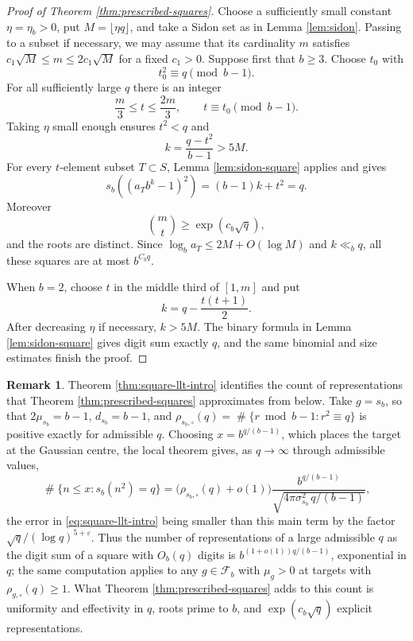 \documentclass[11pt,reqno]{amsart}
\theoremstyle{plain}
\theoremstyle{definition}
\newtheorem{remark}[theorem]{Remark}
\newcommand{\eps}{\varepsilon}
\newcommand{\1}{\mathbf 1}
\DeclareMathOperator{\Card}{\#}
\begin{document}
\begin{proof}[Proof of Theorem \ref{thm:prescribed-squares}]
Choose a sufficiently small constant $\eta=\eta_b>0$, put $M=\lfloor\eta q\rfloor$, and take a Sidon set as in Lemma \ref{lem:sidon}.  Passing to a subset if necessary, we may assume that its cardinality $m$ satisfies $c_1\sqrt M\le m\le2c_1\sqrt M$ for a fixed $c_1>0$.  Suppose first that $b\ge3$.  Choose $t_0$ with
\[
 t_0^2\equiv q\pmod{b-1}.
\]
For all sufficiently large $q$ there is an integer
\[
 \frac m3\le t\le\frac{2m}3,\qquad t\equiv t_0\pmod{b-1}.
\]
Taking $\eta$ small enough ensures $t^2<q$ and
\[
 k=\frac{q-t^2}{b-1}>5M.
\]
For every $t$-element subset $T\subset S$, Lemma \ref{lem:sidon-square} applies and gives
\[
 s_b((a_Tb^k-1)^2)=(b-1)k+t^2=q.
\]
Moreover
\[
 \binom mt\ge \exp(c_b\sqrt q),
\]
and the roots are distinct.  Since $\log_ba_T\le2M+O(\log M)$ and $k\ll_bq$, all these squares are at most $b^{C_bq}$.

When $b=2$, choose $t$ in the middle third of $[1,m]$ and put
\[
 k=q-\frac{t(t+1)}2.
\]
After decreasing $\eta$ if necessary, $k>5M$.  The binary formula in Lemma \ref{lem:sidon-square} gives digit sum exactly $q$, and the same binomial and size estimates finish the proof.
\end{proof}

\begin{remark}\label{rem:llt-count}
Theorem \ref{thm:square-llt-intro} identifies the count of representations that Theorem \ref{thm:prescribed-squares} approximates from below.  Take $g=s_b$, so that $2\mu_{s_b}=b-1$, $d_{s_b}=b-1$, and $\rho_{s_b,\square}(q)=\Card\{r\bmod{b-1}:r^2\equiv q\}$ is positive exactly for admissible $q$.  Choosing $x=b^{q/(b-1)}$, which places the target at the Gaussian centre, the local theorem gives, as $q\to\infty$ through admissible values,
\[
 \Card\{n\le x:s_b(n^2)=q\}
 =\bigl(\rho_{s_b,\square}(q)+o(1)\bigr)
 \frac{b^{q/(b-1)}}{\sqrt{4\pi\sigma_{s_b}^2\,q/(b-1)}},
\]
the error in \eqref{eq:square-llt-intro} being smaller than this main term by the factor $\sqrt q/(\log q)^{5+\eps}$.  Thus the number of representations of a large admissible $q$ as the digit sum of a square with $O_b(q)$ digits is $b^{(1+o(1))q/(b-1)}$, exponential in $q$; the same computation applies to any $g\in\mathcal F_b$ with $\mu_g>0$ at targets with $\rho_{g,\square}(q)\ge1$.  What Theorem \ref{thm:prescribed-squares} adds to this count is uniformity and effectivity in $q$, roots prime to $b$, and $\exp(c_b\sqrt q)$ explicit representations.
\end{remark}
\end{document}
